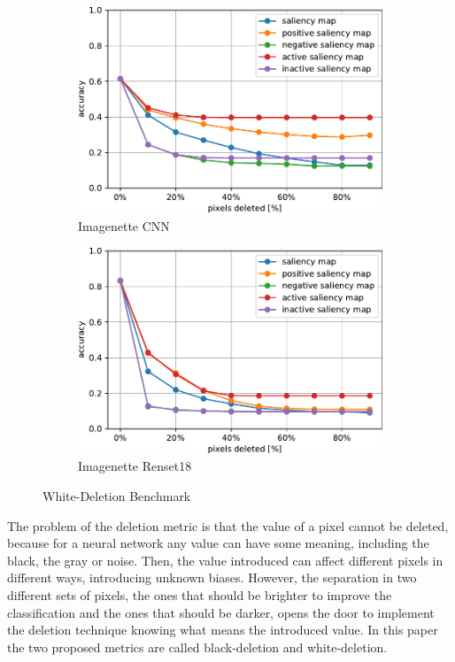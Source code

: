 \documentclass[preprint,12pt]{elsarticle}
\begin{document}
\begin{figure}[h]
\begin{subfigure}{0.49\textwidth}
        \includegraphics[width=\linewidth]{../visualizations/benchmarks/white_deletion/imagenette_cnn.pdf}
        \caption{Imagenette CNN}
    \end{subfigure}
    \hfill
    \begin{subfigure}{0.49\textwidth}
        \centering
        \includegraphics[width=\linewidth]{../visualizations/benchmarks/white_deletion/imagenette_resnet18.pdf}
        \caption{Imagenette Renset18}
    \end{subfigure}
    \caption{White-Deletion Benchmark}
    \label{fig: white-deletion benchmark}
\end{figure}

The problem of the deletion metric is that the value of a pixel cannot be deleted, because for a neural network any value can have some meaning, including the black, the gray or noise. Then, the value introduced can affect different pixels in different ways, introducing unknown biases. However, the separation in two different sets of pixels, the ones that should be brighter to improve the classification and the ones that should be darker, opens the door to implement the deletion technique knowing what means the introduced value. In this paper the two proposed metrics are called black-deletion and white-deletion.
\end{document}
